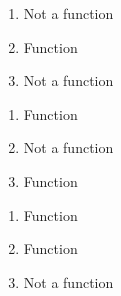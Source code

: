 \begin{multicols}{3}
\begin{enumerate}
\setcounter{enumi}{\value{HW}}

\item  Not a function
\item  Function
\item  Not a function

\setcounter{HW}{\value{enumi}}
\end{enumerate}
\end{multicols}

\begin{multicols}{3}
\begin{enumerate}
\setcounter{enumi}{\value{HW}}

\item   Function
\item   Not a function
\item Function

\setcounter{HW}{\value{enumi}}
\end{enumerate}
\end{multicols}

\begin{multicols}{3}
\begin{enumerate}
\setcounter{enumi}{\value{HW}}

\item Function
\item  Function
\item Not a function

\setcounter{HW}{\value{enumi}}
\end{enumerate}
\end{multicols}
\closegraphsfile